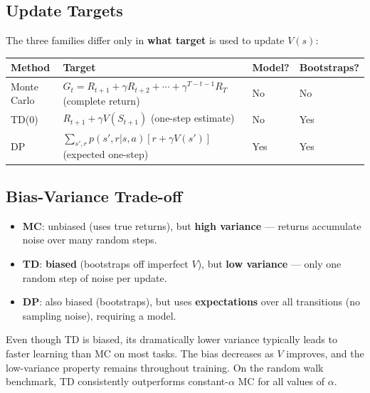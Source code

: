 \documentclass[11pt,a4paper]{article}
\theoremstyle{definition}
\theoremstyle{plain}
\theoremstyle{remark}
\begin{document}
\subsection{Update Targets}

The three families differ only in \textbf{what target} is used to update $V(s)$:

\begin{center}
\begin{tabular}{llll}
\hline
\textbf{Method} & \textbf{Target} & \textbf{Model?} & \textbf{Bootstraps?} \\
\hline
Monte Carlo  & $G_t = R_{t+1} + \gamma R_{t+2} + \cdots + \gamma^{T-t-1}R_T$ (complete return) & No  & No  \\
TD(0)        & $R_{t+1} + \gamma V(S_{t+1})$ (one-step estimate)                               & No  & Yes \\
DP           & $\sum_{s',r} p(s',r|s,a)[r + \gamma V(s')]$ (expected one-step)                 & Yes & Yes \\
\hline
\end{tabular}
\end{center}

\subsection{Bias-Variance Trade-off}

\begin{itemize}
    \item \textbf{MC}: unbiased (uses true returns), but \textbf{high variance} — returns accumulate noise over many random steps.
    \item \textbf{TD}: \textbf{biased} (bootstraps off imperfect $V$), but \textbf{low variance} — only one random step of noise per update.
    \item \textbf{DP}: also biased (bootstraps), but uses \textbf{expectations} over all transitions (no sampling noise), requiring a model.
\end{itemize}

\begin{tcolorbox}[colback=orange!5!white, colframe=orange!75!black, title={\textbf{Why TD is Often Faster in Practice}}]
Even though TD is biased, its dramatically lower variance typically leads to faster learning than MC on most tasks. The bias decreases as $V$ improves, and the low-variance property remains throughout training. On the random walk benchmark, TD consistently outperforms constant-$\alpha$ MC for all values of $\alpha$.
\end{tcolorbox}
\end{document}
